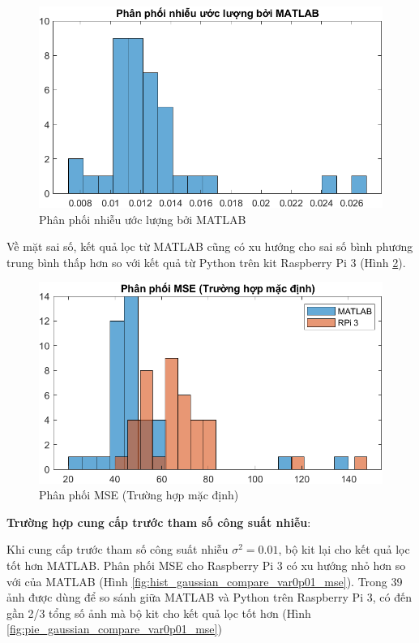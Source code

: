 \begin{figure}[H]
    \centering
    \includegraphics[width=.75\linewidth]{../images/hist_gaussian_compare_matlab_noise.png}
    \caption{Phân phối nhiễu ước lượng bởi MATLAB}
    \label{fig:hist_gaussian_compare_matlab_noise}
\end{figure}

Về mặt sai số, kết quả lọc từ MATLAB cũng có xu hướng cho sai số bình phương trung bình 
thấp hơn so với kết quả từ Python trên kit Raspberry Pi 3 (Hình \ref{fig:hist_gaussian_compare_default_mse}).

\begin{figure}[H]
    \centering
    \includegraphics[width=.75\linewidth]{../images/hist_gaussian_compare_default_mse.png}
    \caption{Phân phối MSE (Trường hợp mặc định)}
    \label{fig:hist_gaussian_compare_default_mse}
\end{figure}

\begin{center}
    \textbf{Trường hợp cung cấp trước tham số công suất nhiễu}:
\end{center}

Khi cung cấp trước tham số công suất nhiễu $\sigma^2 = 0.01$, 
bộ kit lại cho kết quả lọc tốt hơn MATLAB.
Phân phối MSE cho Raspberry Pi 3 có xu hướng nhỏ hơn so với của MATLAB (Hình \ref{fig:hist_gaussian_compare_var0p01_mse}).
Trong 39 ảnh được dùng để so sánh giữa MATLAB và Python trên Raspberry Pi 3, có đến gần 2/3 tổng số ảnh mà bộ kit cho kết quả lọc tốt hơn (Hình \ref{fig:pie_gaussian_compare_var0p01_mse})

